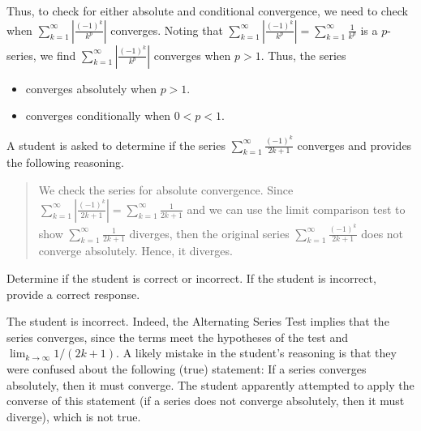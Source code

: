 \documentclass[noauthor]{ximera}
\begin{document}
\begin{problem}
\begin{freeResponse}
Thus, to check for either absolute and conditional convergence, we need to check when $\sum_{k =1}^{\infty} \left| \frac{(-1)^k}{k^p} \right|$ converges.  Noting that $\sum_{k =1}^{\infty} \left| \frac{(-1)^k}{k^p} \right| = \sum_{k =1}^{\infty}  \frac{1}{k^p}$  is a $p$-series, we find $\sum_{k =1}^{\infty} \left| \frac{(-1)^k}{k^p} \right|$ converges when $p >1$.  Thus, the series 

\begin{itemize}
\item converges absolutely when $p>1$.
\item converges conditionally when $0<p<1$.
\end{itemize}

\end{freeResponse}
\end{problem}

\begin{problem}
A student is asked to determine if the series $\sum_{k=1}^{\infty} \frac{(-1)^k}{2k+1}$ converges and provides the following reasoning. 

\begin{quote}
We check the series for absolute convergence.   Since $\sum_{k=1}^{\infty} \left| \frac{(-1)^k}{2k+1} \right| = \sum_{k=1}^{\infty} \frac{1}{2k+1}$ and we can use the limit comparison test to show $\sum_{k=1}^{\infty} \frac{1}{2k+1}$ diverges, then the original series $\sum_{k=1}^{\infty} \frac{(-1)^k}{2k+1}$ does not converge absolutely.  Hence, it diverges.
\end{quote}
Determine if the student is correct or incorrect.  If the student is incorrect, provide a correct response.
\begin{freeResponse}
The student is incorrect. Indeed, the Alternating Series Test implies that the series converges, since the terms meet the hypotheses of the test and $\lim_{k \rightarrow \infty} 1/(2k+1)$. A likely mistake in the student's reasoning is that they were confused about the following (true) statement: If a series converges absolutely, then it must converge. The student apparently attempted to apply the converse of this statement (if a series does not converge absolutely, then it must diverge), which is not true.
\end{freeResponse}
\end{problem}
\end{document}
